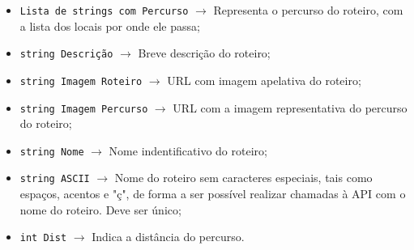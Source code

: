 \begin{itemize}
    \item \texttt{Lista de strings com Percurso} $\rightarrow$ Representa o percurso do roteiro, com a lista dos locais por onde ele passa;
    \item \texttt{string Descrição} $\rightarrow$ Breve descrição do roteiro;
    \item \texttt{string Imagem Roteiro} $\rightarrow$ URL com imagem apelativa do roteiro;
    \item \texttt{string Imagem Percurso} $\rightarrow$ URL com a imagem representativa do percurso do roteiro;
    \item \texttt{string Nome} $\rightarrow$ Nome indentificativo do roteiro;
    \item \texttt{string ASCII} $\rightarrow$ Nome do roteiro sem caracteres especiais, tais como espaços, acentos e "ç", de forma a ser possível realizar chamadas à API com o nome do roteiro. Deve ser único;
    \item \texttt{int Dist} $\rightarrow$ Indica a distância do percurso.
\end{itemize}